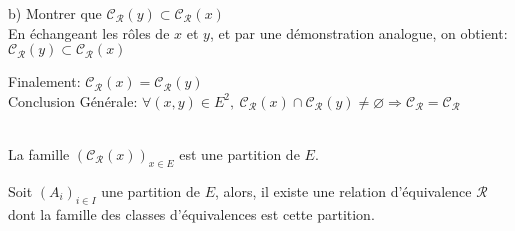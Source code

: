 \documentclass[12pt,twoside,a4paper]{article}
\begin{document}
\begin{preuve}
\begin{liste}
\begin{liste}
						\item[b)] Montrer que $\mathcal{C_R}(y)\subset \mathcal{C_R}(x)$\\
							En \'echangeant les rôles de $x$ et $y$, et par une d\'emonstration analogue, on obtient:\\
							$\mathcal{C_R}(y)\subset \mathcal{C_R}(x)$
					\end{liste}
					Finalement: $\mathcal{C_R}(x)=\mathcal{C_R}(y)$\\
					Conclusion G\'en\'erale: $\forall(x,y)\in E^2,\ \mathcal{C_R}(x)\cap\mathcal{C_R}(y)\neq\varnothing\Rightarrow\mathcal{C_R}=\mathcal{C_R}$
			\end{liste}\ \\
			La famille $(\mathcal{C_R}(x))_{x\in E}$ est une partition de $E$.
		\end{preuve}
		\begin{prop}
			Soit $\left(A_i\right)_{i\in I}$ une partition de $E$, alors, il existe une relation d'\'equivalence $\mathcal{R}$ dont la famille des classes d'\'equivalences est cette partition.
		\end{prop}
\end{document}
